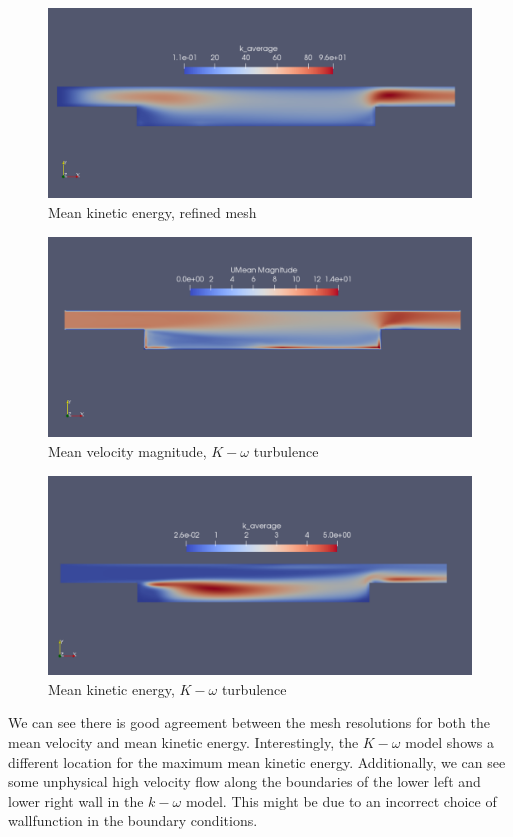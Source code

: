 \documentclass[paper=a4, fontsize=11pt]{article} %
\numberwithin{equation}{section} %
\numberwithin{figure}{section} %
\numberwithin{table}{section} %
\begin{document}
    \begin{figure}[H]
        \centering
        \includegraphics[width=0.6\linewidth]{Figures/simple_refined_K_mean}
        \caption{Mean kinetic energy, refined mesh}
        \label{fig:MeanKSimpleRef}
    \end{figure}

    \begin{figure}[H]
        \centering
        \includegraphics[width=0.6\linewidth]{Figures/simple_KOmega_U_mean}
        \caption{Mean velocity magnitude, $K - \omega$ turbulence}
        \label{fig:MeanUKOmega}
    \end{figure}

    \begin{figure}[H]
        \centering
        \includegraphics[width=0.6\linewidth]{Figures/simple_KOmega_K_mean}
        \caption{Mean kinetic energy, $K - \omega$ turbulence}
        \label{fig:MeanKKomega}
    \end{figure}


    We can see there is good agreement between the mesh resolutions for both the mean velocity and mean kinetic energy. Interestingly, the $K-\omega$ model shows a different location for the maximum mean kinetic energy. Additionally, we can see some unphysical high velocity flow along the boundaries of the lower left and lower right wall in the $k-\omega$ model. This might be due to an incorrect choice of wallfunction in the boundary conditions.
    \clearpage
\end{document}
